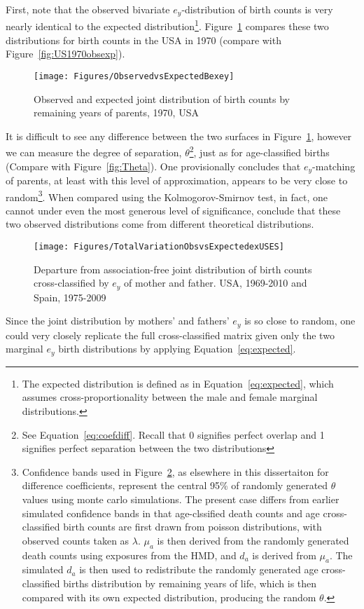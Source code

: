  \FloatBarrier
\label{sec:exobsexpected}
First, note that the observed bivariate $e_y$-distribution of birth counts is
very nearly identical to the expected distribution\footnote{The expected
distribution is defined as in Equation~\eqref{eq:expected}, which assumes
cross-proportionality between the male and female marginal distributions.}.
Figure~\ref{fig:US1970obsexpex} compares these two distributions for 
birth counts in the USA in 1970 (compare with Figure~\ref{fig:US1970obsexp}). 

\begin{figure}[ht!]
        \centering  
          \caption{Observed and expected joint distribution of birth
          counts by remaining years of parents, 1970, USA}
           \texttt{[image: Figures/ObservedvsExpectedBexey]}
          \label{fig:US1970obsexpex}
\end{figure}

It is
difficult to see any difference between the two surfaces in
Figure~\ref{fig:US1970obsexpex}, however we can measure the degree of
separation, $\theta$\footnote{See Equation~\eqref{eq:coefdiff}. Recall that 0 signifies
perfect overlap and 1 signifies perfect separation between the two
distributions}, just as for age-classified births (Compare with
Figure~\ref{fig:Theta}). One provisionally concludes that $e_y$-matching of
parents, at least with this level of approximation, appears to be very close to
random\footnote{Confidence bands used in Figure~\ref{fig:TotalVarobsexpex}, as
elsewhere in this dissertaiton for difference coefficients, represent the
central 95\% of randomly generated $\theta$ values using monte carlo
simulations. The present case differs from earlier simulated confidence bands in
that age-clssified death counts and age cross-classified birth counts 
are first drawn from poisson distributions, with
observed counts taken as $\lambda$. $\mu_a$ is then derived from the randomly
generated death counts using exposures from the HMD, and $d_a$ is derived from
$\mu_a$. The simulated $d_a$ is then used to redistribute the randomly generated
age cross-classified births distribution by remaining years of life, which is
then compared with its own expected distribution, producing the random $\theta$.}. 
When compared using the
Kolmogorov-Smirnov test, in fact, one cannot under even the most generous level
of significance, conclude that these two observed distributions come from
different theoretical distributions.

\begin{figure}[ht!]
        \centering  
          \caption{Departure from association-free joint distribution of
          birth counts cross-classified by $e_y$ of mother and father. USA,
          1969-2010 and Spain, 1975-2009}
           \texttt{[image: Figures/TotalVariationObsvsExpectedexUSES]}
          \label{fig:TotalVarobsexpex}
\end{figure}

Since the joint distribution by mothers' and fathers' $e_y$ is so close
to random, one could very closely replicate the full cross-classified matrix 
given only the two marginal
$e_y$ birth distributions by applying Equation~\eqref{eq:expected}. 

\FloatBarrier